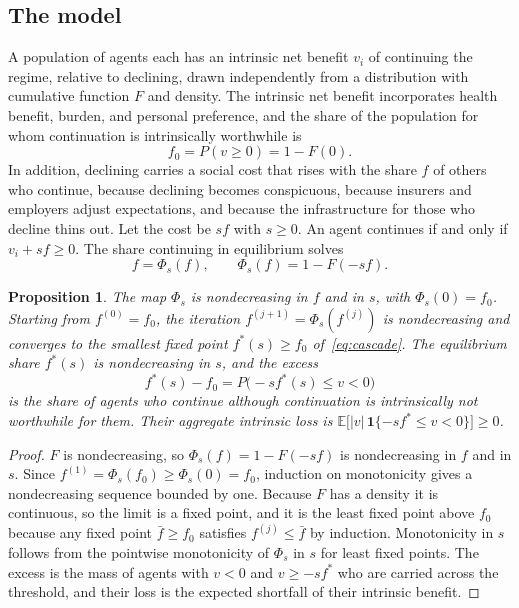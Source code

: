 \documentclass[11pt]{article}
\theoremstyle{plain}
\newtheorem{proposition}{Proposition}
\theoremstyle{definition}
\theoremstyle{remark}
\newcommand{\E}{\mathbb{E}}
\newcommand{\Ind}{\mathbf{1}}
\begin{document}
\subsection{The model}

A population of agents each has an intrinsic net benefit $v_i$ of continuing the regime, relative to declining, drawn independently from a distribution with cumulative function $F$ and density. The intrinsic net benefit incorporates health benefit, burden, and personal preference, and the share of the population for whom continuation is intrinsically worthwhile is
\[
f_0=P(v\ge0)=1-F(0).
\]
In addition, declining carries a social cost that rises with the share $f$ of others who continue, because declining becomes conspicuous, because insurers and employers adjust expectations, and because the infrastructure for those who decline thins out. Let the cost be $s f$ with $s\ge0$. An agent continues if and only if $v_i+sf\ge0$. The share continuing in equilibrium solves
\begin{equation}\label{eq:cascade}
f=\Phi_s(f),\qquad \Phi_s(f)=1-F(-sf).
\end{equation}

\begin{proposition}\label{prop:cascade}
The map $\Phi_s$ is nondecreasing in $f$ and in $s$, with $\Phi_s(0)=f_0$. Starting from $f^{(0)}=f_0$, the iteration $f^{(j+1)}=\Phi_s(f^{(j)})$ is nondecreasing and converges to the smallest fixed point $f^\ast(s)\ge f_0$ of~\eqref{eq:cascade}. The equilibrium share $f^\ast(s)$ is nondecreasing in $s$, and the excess
\[
f^\ast(s)-f_0=P\big(-sf^\ast(s)\le v<0\big)
\]
is the share of agents who continue although continuation is intrinsically not worthwhile for them. Their aggregate intrinsic loss is $\E\big[|v|\,\Ind\{-sf^\ast\le v<0\}\big]\ge0$.
\end{proposition}

\begin{proof}
$F$ is nondecreasing, so $\Phi_s(f)=1-F(-sf)$ is nondecreasing in $f$ and in $s$. Since $f^{(1)}=\Phi_s(f_0)\ge\Phi_s(0)=f_0$, induction on monotonicity gives a nondecreasing sequence bounded by one. Because $F$ has a density it is continuous, so the limit is a fixed point, and it is the least fixed point above $f_0$ because any fixed point $\bar f\ge f_0$ satisfies $f^{(j)}\le\bar f$ by induction. Monotonicity in $s$ follows from the pointwise monotonicity of $\Phi_s$ in $s$ for least fixed points. The excess is the mass of agents with $v<0$ and $v\ge-sf^\ast$ who are carried across the threshold, and their loss is the expected shortfall of their intrinsic benefit.
\end{proof}
\end{document}
